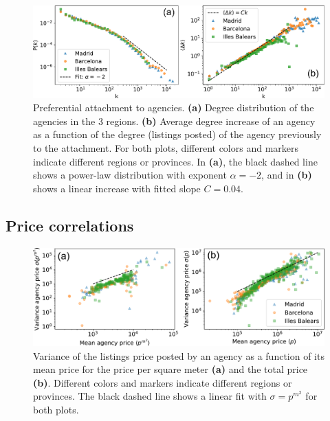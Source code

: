 \begin{figure}
    \label{fig:panel_degree}
    \centering
    \includegraphics[width =\textwidth]{Figs/Idealista_dynamics/panel_degree.pdf}
	\caption[Preferential attachment to agencies.]{Preferential attachment to agencies. \textbf{(a)} Degree distribution of the agencies in the 3 regions. \textbf{(b)} Average degree increase of an agency as a function of the degree (listings posted) of the agency previously to the attachment. For both plots, different colors and markers indicate different regions or provinces. In \textbf{(a)}, the black dashed line shows a power-law distribution with exponent $\alpha  =-2$, and in \textbf{(b)} shows a linear increase with fitted slope $C = 0.04$.}
\end{figure}

\subsection{Price correlations}

\begin{figure}
    \label{fig:sigma_price}
    \centering
    \includegraphics[width =\textwidth]{Figs/Idealista_dynamics/labeled_sigma_price.pdf}
	\caption[Variance of the agency price vs mean agency price.]{Variance of the listings price posted by an agency as a function of its mean price for the price per square meter \textbf{(a)} and the total price \textbf{(b)}. Different colors and markers indicate different regions or provinces. The black dashed line shows a linear fit with $\sigma = p^{{m}^2}$ for both plots.}
\end{figure}

